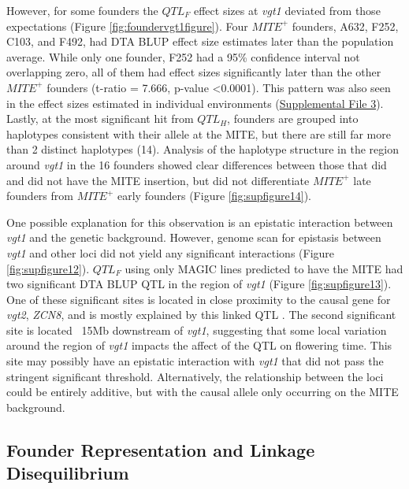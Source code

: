 \documentclass[article,9pt,twocolumn,twoside]{rilabRxiv}
\begin{document}
However, for some founders the $QTL_F$ effect sizes at \emph{vgt1} deviated from those expectations (Figure \ref{fig:foundervgt1figure}).
Four $MITE^+$ founders, A632, F252, C103, and F492, had DTA BLUP effect size estimates later than the population average.
While only one founder, F252 had a 95\% confidence interval not overlapping zero, all of them had effect sizes significantly later than the other $MITE^+$ founders (t-ratio = 7.666, p-value <0.0001).
This pattern was also seen in the effect sizes estimated in individual environments (\href{run:figures/Methods_Supplemental3.pdf}{Supplemental File 3}).
Lastly, at the most significant hit from $QTL_H$, founders are grouped into haplotypes consistent with their allele at the MITE, but there are still far more than 2 distinct haplotypes (14).
Analysis of the haplotype structure in the region around \emph{vgt1} in the 16 founders showed clear differences between those that did and did not have the MITE insertion, but did not differentiate $MITE^+$ late founders from $MITE^+$ early founders (Figure \ref{fig:supfigure14}).

One possible explanation for this observation is an epistatic interaction between \emph{vgt1} and the genetic background.
However, genome scan for epistasis between \emph{vgt1} and other loci did not yield any significant interactions (Figure \ref{fig:supfigure12}).
$QTL_F$ using only MAGIC lines predicted to have the MITE had two significant DTA BLUP QTL in the region of \emph{vgt1} (Figure \ref{fig:supfigure13}).
One of these significant sites is located in close proximity to the causal gene for \emph{vgt2}, \emph{ZCN8}, and is mostly explained by this linked QTL \citep{Guo}.
The second significant site is located ~15Mb downstream of \emph{vgt1}, suggesting that some local variation around the region of \emph{vgt1} impacts the affect of the QTL on flowering time.
This site may possibly have an epistatic interaction with \emph{vgt1} that did not pass the stringent significant threshold.
Alternatively, the relationship between the loci could be entirely additive, but with the causal allele only occurring on the MITE background.


\subsection{Founder Representation and Linkage Disequilibrium}
\end{document}

